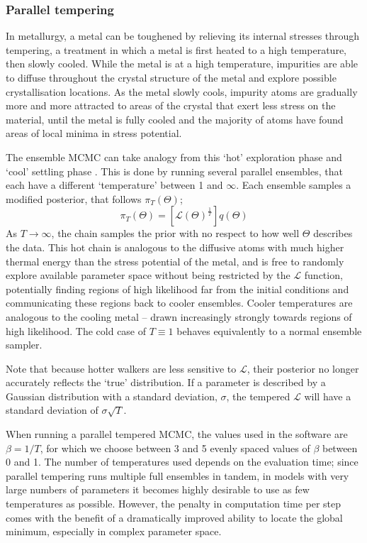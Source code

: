 \subsubsection{Parallel tempering}
\label{sect:modelling:parallel tempering}

In metallurgy, a metal can be toughened by relieving its internal stresses through tempering, a treatment in which a metal is first heated to a high temperature, then slowly cooled.
While the metal is at a high temperature, impurities are able to diffuse throughout the crystal structure of the metal and explore possible crystallisation locations. As the metal slowly cools, impurity atoms are gradually more and more attracted to areas of the crystal that exert less stress on the material, until the metal is fully cooled and the majority of atoms have found areas of local minima in stress potential.

The ensemble MCMC can take analogy from this `hot' exploration phase and `cool' settling phase . This is done by running several parallel ensembles, that each have a different `temperature' between 1 and $\infty$. Each ensemble samples a modified posterior, that follows $\pi_T(\Theta)$;
\begin{equation}
    \pi_T(\Theta) = [\mathcal{L}(\Theta)^\frac{1}{T}] q(\Theta)
\end{equation}
As $T \rightarrow \infty$, the chain samples the prior with no respect to how well $\Theta$ describes the data. This hot chain is analogous to the diffusive atoms with much higher thermal energy than the stress potential of the metal, and is free to randomly explore available parameter space without being restricted by the $\mathcal{L}$ function, potentially finding regions of high likelihood far from the initial conditions and communicating these regions back to cooler ensembles. Cooler temperatures are analogous to the cooling metal -- drawn increasingly strongly towards regions of high likelihood.
The cold case of $T \equiv 1$ behaves equivalently to a normal ensemble sampler.

Note that because hotter walkers are less sensitive to $\mathcal{L}$, their posterior no longer accurately reflects the `true' distribution. If a parameter is described by a Gaussian distribution with a standard deviation, $\sigma$, the tempered $\mathcal{L}$ will have a standard deviation of $\sigma \sqrt{T}$.

When running a parallel tempered MCMC, the values used in the software are $\beta = 1/T$, for which we choose between 3 and 5 evenly spaced values of $\beta$ between 0 and 1.
The number of temperatures used depends on the evaluation time; since parallel tempering runs multiple full ensembles in tandem, in models with very large numbers of parameters it becomes highly desirable to use as few temperatures as possible. However, the penalty in computation time per step comes with the benefit of a dramatically improved ability to locate the global minimum, especially in complex parameter space.



